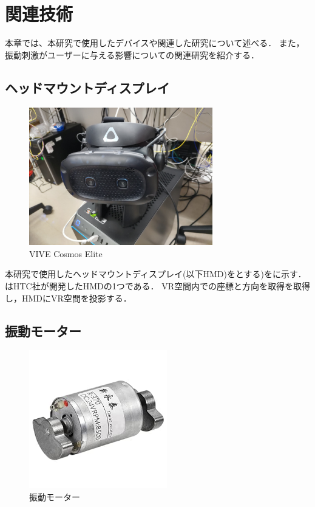 \chapter{関連技術}

本章では、本研究で使用したデバイスや関連した研究について述べる．
また，振動刺激がユーザーに与える影響についての関連研究を紹介する．

\section{ヘッドマウントディスプレイ}

\begin{figure}[h]
\centering
\includegraphics[clip,width=8cm]{./fig/VIVE.png}
\caption{VIVE Cosmos Elite}\label{vive}
\end{figure}

本研究で使用したヘッドマウントディスプレイ(以下HMD)をとする)をに示す．
はHTC社が開発したHMDの1つである．
VR空間内での座標と方向を取得を取得し，HMDにVR空間を投影する．




\newpage

\section{振動モーター}

\begin{figure}[h]
\centering
\includegraphics[clip,width=6cm]{./fig/Motor.jpg}
\caption{振動モーター}\label{motor}
\end{figure}

